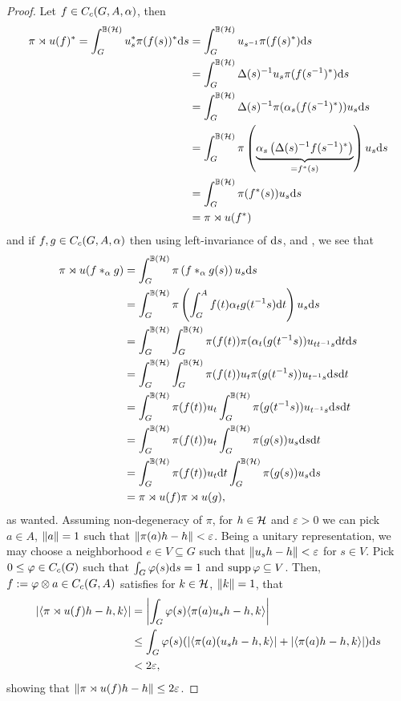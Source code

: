 \begin{proof}
	Let $f \in C_c(G,A,\alpha)$, then
	\begin{align*}
		\pi \rtimes u(f)^* = \int_G^{\mathbb{B}(\mathcal{H})}  u_s^* \pi(f(s))^* \mathrm{d} s &= \int_G^{\mathbb{B}(\mathcal{H})} u_{s^{-1}} \pi(f(s)^*) \mathrm{d} s\\
		&= \int_G^{\mathbb{B}(\mathcal{H})} \Delta(s)^{-1} u_{s} \pi(f(s^{-1})^*) \mathrm{d} s \\
		&= \int_G^{\mathbb{B}(\mathcal{H})} \Delta(s)^{-1} \pi(\alpha_s(f(s^{-1})^*)) u_s \mathrm{d} s\\
		&= \int_G^{\mathbb{B}(\mathcal{H})} \pi\left( \underbrace{\alpha_s\left( \Delta(s)^{-1}f(s^{-1})^* \right)}_{=f^*(s)} \right) u_s \mathrm{d} s\\
		&= \int_G^{\mathbb{B}(\mathcal{H})} \pi(f^*(s)) u_s \mathrm{d} s\\
		&= \pi \rtimes u(f^*)
	\end{align*}
	and if $f,g \in C_c(G,A,\alpha)$ then using left-invariance of $\mathrm{d} s$,  and , we see that
	\begin{align*}
		\pi \rtimes u(f\ast_{\alpha}g) &= \int_G^{\mathbb{B}(\mathcal{H})} \pi \left( f \ast_\alpha g(s) \right)u_s \mathrm{d} s\\
		&= \int_G^{\mathbb{B}(\mathcal{H})} \pi\left( \int_G^A f(t) \alpha_t g(t^{-1}s) \mathrm{d} t \right)u_s \mathrm{d} s\\
		&= \int_G^{\mathbb{B}(\mathcal{H})}\int_G^{\mathbb{B}(\mathcal{H})} \pi(f(t)) \pi(\alpha_t(g(t^{-1}s))u_{t t^{-1}s} \mathrm{d} t \mathrm{d} s\\
		&= \int_G^{\mathbb{B}(\mathcal{H})} \int_G ^{\mathbb{B}(\mathcal{H})} \pi(f(t)) u_t \pi(g(t^{-1}s)) u_{t^{-1}s}\mathrm{d} s \mathrm{d} t\\
		&= \int_G^{\mathbb{B}(\mathcal{H})} \pi(f(t)) u_t \int_G^{\mathbb{B}(\mathcal{H})} \pi(g(t^{-1}s )) u_{t^{-1}s} \mathrm{d} s \mathrm{d} t\\
		&= \int_G ^{\mathbb{B}(\mathcal{H})} \pi(f(t)) u_t \int_G ^{\mathbb{B}(\mathcal{H})} \pi(g(s)) u_s \mathrm{d} s \mathrm{d} t\\
		&= \int_G ^{\mathbb{B}(\mathcal{H})} \pi(f(t)) u_t \mathrm{d} t \int_G ^{\mathbb{B}(\mathcal{H})} \pi(g(s)) u_s \mathrm{d} s \\
		&= \pi \rtimes u (f) \pi\rtimes u (g),
	\end{align*}
	as wanted. Assuming non-degeneracy of $\pi$, for $h \in \mathcal{H}$ and $\varepsilon>0$ we can pick $a \in A$, $\left\lVert a \right\rVert =1$ such that $\left\lVert \pi(a) h - h \right\rVert < \varepsilon$. Being a unitary representation, we may choose a neighborhood $e \in V \subseteq G$ such that $\left\lVert u_s h - h\right\rVert < \varepsilon$ for $s \in V$. Pick $0 \leq \varphi \in C_c(G)$ such that $\int_G \varphi(s) \mathrm{d} s = 1$ and $\operatorname{supp} \varphi \subseteq V$. Then, $f := \varphi \otimes a \in C_c(G,A)$ satisfies for $k \in \mathcal{H}$, $\left\lVert k \right\rVert = 1$, that
	\begin{align*}
	\left| \langle \pi \rtimes u(f)h-h,k\rangle \right| &= 	\left| \int_G \varphi(s) \langle \pi(a)u_s h-h,k \rangle\right|\\
	& \leq \int_G \varphi(s) (|\langle \pi(a) (u_s h-h,k\rangle|+|\langle \pi(a)h-h,k\rangle| ) \mathrm{d} s \\
	&< 2 \varepsilon,
	\end{align*}
	showing that $\left\lVert \pi \rtimes u(f)h-h\right\rVert \leq 2 \varepsilon$.
\end{proof}




